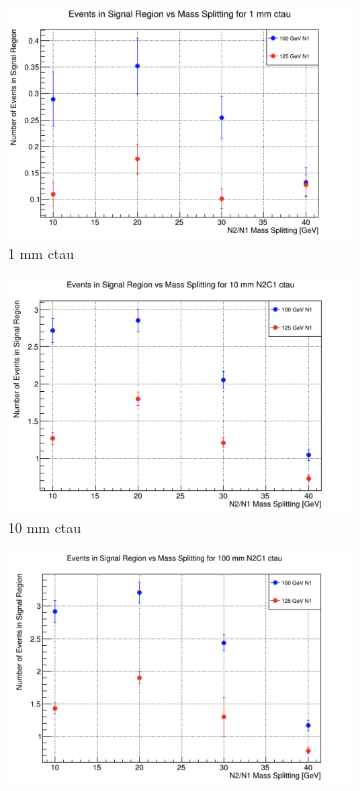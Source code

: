 \documentclass{article}
\begin{document}
\begin{figure} [H]
\begin{subfigure}{.5\textwidth}
  \centering
  \includegraphics[width=.8\linewidth]{1mm.png}  
  \caption{1 mm ctau}
  \label{fig:sub-first18}
\end{subfigure}
\begin{subfigure}{.5\textwidth}
  \centering
  \includegraphics[width=.8\linewidth]{10mm.png}  
  \caption{10 mm ctau}
  \label{fig:sub-second18}
\end{subfigure}
\begin{subfigure}{.5\textwidth}
  \centering
  \includegraphics[width=.8\linewidth]{100mm.png}  

\end{subfigure}
\end{figure}
\end{document}

